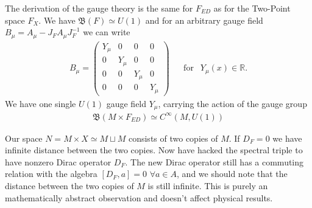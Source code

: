 The derivation of the gauge theory is the same for $F_{ED}$ as for the
Two-Point space $F_X$. We have $\mathfrak{B}(F) \simeq U(1)$ and for an
arbitrary gauge field $B_\mu = A_\mu - J_F A_\mu J_F^{-1}$ we can write
\begin{align} \label{field}
    B_\mu =
    \begin{pmatrix}
        Y_\mu & 0 & 0 & 0 \\
        0 & Y_\mu& 0 & 0 \\
        0 & 0 & Y_\mu& 0 \\
        0 & 0 & 0 & Y_\mu
    \end{pmatrix} \;\;\;\;\;\ \text{for} \;\;\ Y_\mu (x) \in \mathbb{R}.
\end{align}
We have one single $U(1)$ gauge field $Y_\mu$, carrying the action of the
gauge group
\begin{align}
   \text{$\mathfrak{B}$}(M\times F_{ED}) \simeq C^\infty(M, U(1))
\end{align}

Our space $N = M\times X \simeq M\sqcup M$ consists of two copies of $M$.
If $D_F = 0$ we have infinite distance between the two copies. Now have
hacked the spectral triple to have nonzero Dirac operator $D_F$. The new
Dirac operator still has a commuting relation with the algebra $[D_F, a] = 0$
$\forall a \in A$, and we should note that the distance between the two
copies of $M$ is still infinite. This is purely an mathematically abstract
observation and doesn't affect physical results.

